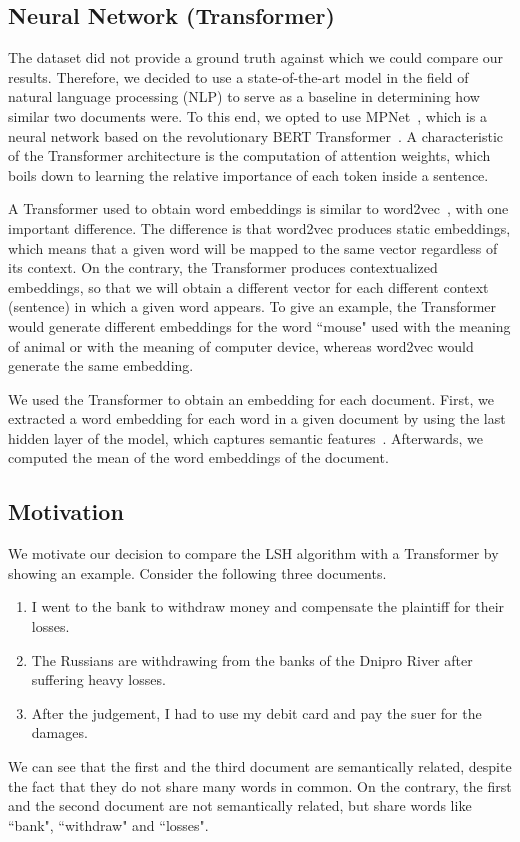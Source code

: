 \documentclass[runningheads]{llncs}
\begin{document}
\subsection{Neural Network (Transformer)}
\label{subsec:models:transformer}

The dataset did not provide a ground truth against which we could compare our results. Therefore, we decided to use a state-of-the-art model in the field of natural language processing (NLP) to serve as a baseline in determining how similar two documents were. To this end, we opted to use MPNet~\cite{song_2020}, which is a neural network based on the revolutionary BERT Transformer~\cite{vaswani_2017, devlin-etal-2019-bert}. A characteristic of the Transformer architecture is the computation of attention weights, which boils down to learning the relative importance of each token inside a sentence. 

A Transformer used to obtain word embeddings is similar to word2vec~\cite{mikolov-etal-2013-word2vec}, with one important difference. The difference is that word2vec produces static embeddings, which means that a given word will be mapped to the same vector regardless of its context. On the contrary, the Transformer produces contextualized embeddings, so that we will obtain a different vector for each different context (sentence) in which a given word appears. To give an example, the Transformer would generate different embeddings for the word “mouse" used with the meaning of animal or with the meaning of computer device, whereas word2vec would generate the same embedding.

We used the Transformer to obtain an embedding for each document. First, we extracted a word embedding for each word in a given document by using the last hidden layer of the model, which captures semantic features~\cite{laicher-etal-2021-explaining}. Afterwards, we computed the mean of the word embeddings of the document.

\subsection{Motivation}
\label{subsec:models:motivation}

We motivate our decision to compare the LSH algorithm with a Transformer by showing an example. Consider the following three documents.
\begin{enumerate}
  \item I went to the bank to withdraw money and compensate the plaintiff for their losses.
  \item The Russians are withdrawing from the banks of the Dnipro River after suffering heavy losses.
  \item After the judgement, I had to use my debit card and pay the suer for the damages.
\end{enumerate}
We can see that the first and the third document are semantically related, despite the fact that they do not share many words in common. On the contrary, the first and the second document are not semantically related, but share words like “bank", “withdraw" and “losses".
\end{document}
